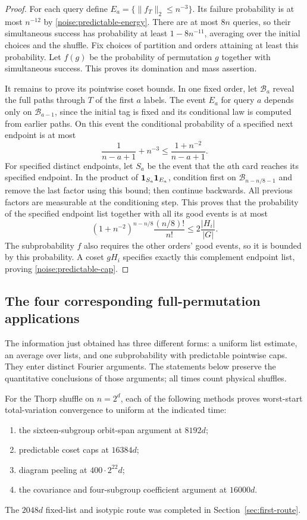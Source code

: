 \begin{proof}
For each query define $E_a=\{\|f_T\|_2\le n^{-3}\}$.
Its failure probability is at most $n^{-12}$ by
\eqref{noise:predictable-energy}. There are at most $8n$ queries,
so their simultaneous success has probability at least $1-8n^{-11}$,
averaging over the initial choices and the shuffle. Fix choices of
partition and orders attaining at least this probability. Let $f(g)$
be the probability of permutation $g$ together with simultaneous
success. This proves its domination and mass assertion.

It remains to prove its pointwise coset bounds. In one fixed order,
let $\mathcal B_a$ reveal the full paths through $T$ of the first
$a$ labels. The event $E_a$ for query $a$ depends only on
$\mathcal B_{a-1}$, since the initial tag is fixed and its conditional
law is computed from earlier paths. On this event the conditional
probability of a specified next endpoint is at most
\[
 \frac1{n-a+1}+n^{-3}
 \le\frac{1+n^{-2}}{n-a+1}.
\]
For specified distinct endpoints, let $S_a$ be the event that the
$a$th card reaches its specified endpoint. In the product of
$\mathbf 1_{S_a}\mathbf 1_{E_a}$, condition first on
$\mathcal B_{n-n/8-1}$ and remove the last factor using this bound;
then continue backwards. All previous factors are measurable at
the conditioning step. This proves that the probability of the
specified endpoint list together with all its good events is at most
\[
 (1+n^{-2})^{n-n/8}\frac{(n/8)!}{n!}
 \le2\frac{|H_i|}{|G|}.
\]
The subprobability $f$ also requires the other orders' good events,
so it is bounded by this probability. A coset $gH_i$ specifies
exactly this complement endpoint list, proving
\eqref{noise:predictable-cap}.
\end{proof}


\subsection{The four corresponding full-permutation applications}

The information just obtained has three different forms: a uniform
list estimate, an average over lists, and one subprobability with
predictable pointwise caps. They enter distinct Fourier arguments.
The statements below preserve the quantitative conclusions of those
arguments; all times count physical shuffles.

\begin{theorem}\label{noise:mixing}
For the Thorp shuffle on $n=2^d$, each of the following methods proves
worst-start total-variation convergence to uniform at the indicated time:
\begin{enumerate}
\item the sixteen-subgroup orbit-span argument at $8192d$;
\item predictable coset caps at $16384d$;
\item diagram peeling at $400\cdot2^{22}d$;
\item the covariance and four-subgroup coefficient argument at $16000d$.
\end{enumerate}
The $2048d$ fixed-list and isotypic route was completed in
Section~\ref{sec:first-route}.
\end{theorem}

